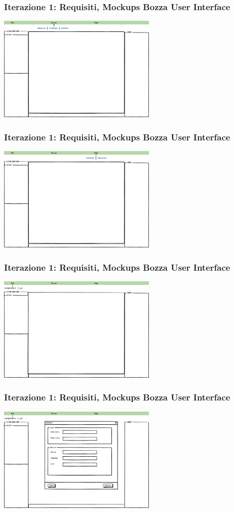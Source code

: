 \documentclass[t]{beamer} %
\begin{document}
\begin{frame}
 \frametitle{Iterazione 1: Requisiti, Mockups Bozza User Interface}
    \includegraphics[height=190px, width=286px,]{image_mockups/02_siuc_menu_server.png}{\centering}
\end{frame}

\begin{frame}
 \frametitle{Iterazione 1: Requisiti, Mockups Bozza User Interface}
    \includegraphics[height=190px, width=286px,]{image_mockups/03_siuc_menu_help.png}{\centering}
\end{frame}

\begin{frame}
 \frametitle{Iterazione 1: Requisiti, Mockups Bozza User Interface}
    \includegraphics[height=190px, width=286px,]{image_mockups/04_siuc_menu_siuc.png}{\centering}
\end{frame}

\begin{frame}
 \frametitle{Iterazione 1: Requisiti, Mockups Bozza User Interface}
    \includegraphics[height=190px, width=286px,]{image_mockups/05_siuc_config_network.png}{\centering}
\end{frame}
\end{document}
